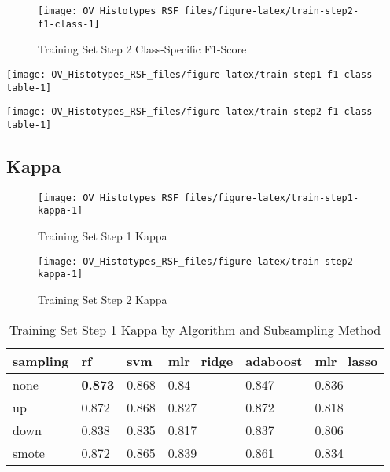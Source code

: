 \documentclass[
]{report}
\begin{document}
\begin{figure}[H]

{\centering \texttt{[image: OV\_Histotypes\_RSF\_files/figure-latex/train-step2-f1-class-1]} 

}

\caption{Training Set Step 2 Class-Specific F1-Score}\label{fig:train-step2-f1-class}
\end{figure}

\begin{center}\texttt{[image: OV\_Histotypes\_RSF\_files/figure-latex/train-step1-f1-class-table-1]} \end{center}

\begin{center}\texttt{[image: OV\_Histotypes\_RSF\_files/figure-latex/train-step2-f1-class-table-1]} \end{center}

\hypertarget{kappa-1}{%
\subsection{Kappa}\label{kappa-1}}

\begin{figure}[H]

{\centering \texttt{[image: OV\_Histotypes\_RSF\_files/figure-latex/train-step1-kappa-1]} 

}

\caption{Training Set Step 1 Kappa}\label{fig:train-step1-kappa}
\end{figure}

\begin{figure}[H]

{\centering \texttt{[image: OV\_Histotypes\_RSF\_files/figure-latex/train-step2-kappa-1]} 

}

\caption{Training Set Step 2 Kappa}\label{fig:train-step2-kappa}
\end{figure}

\begin{table}

\caption{\label{tab:train-step1-kappa-table}Training Set Step 1 Kappa by Algorithm and Subsampling Method}
\centering
\begin{tabular}[t]{l|l|l|l|l|l}
\hline
sampling & rf & svm & mlr\_ridge & adaboost & mlr\_lasso\\
\hline
none & \textbf{0.873} & 0.868 & 0.84 & 0.847 & 0.836\\
\hline
up & 0.872 & 0.868 & 0.827 & 0.872 & 0.818\\
\hline
down & 0.838 & 0.835 & 0.817 & 0.837 & 0.806\\
\hline
smote & 0.872 & 0.865 & 0.839 & 0.861 & 0.834\\
\hline
\end{tabular}
\end{table}
\end{document}
